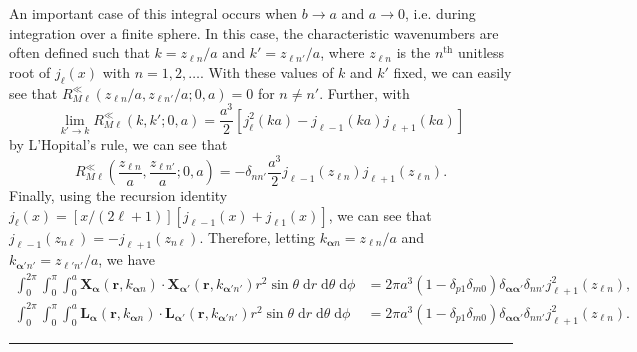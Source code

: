 An important case of this integral occurs when $b\to a$ and $a\to0$, i.e. during integration over a finite sphere. In this case, the characteristic wavenumbers are often defined such that $k = z_{\ell n}/a$ and $k' = z_{\ell n'}/a$, where $z_{\ell n}$ is the $n^\mathrm{th}$ unitless root of $j_\ell(x)$ with $n = 1,2,\ldots$. With these values of $k$ and $k'$ fixed, we can easily see that $R_{M\ell}^\ll(z_{\ell n}/a,z_{\ell n'}/a;0,a) = 0$ for $n\neq n'$. Further, with
\begin{equation}
\lim_{k'\to k}R_{M\ell}^\ll(k,k';0,a) = \frac{a^3}{2}\left[j_\ell^2(ka) - j_{\ell - 1}(ka)j_{\ell + 1}(ka)\right]
\end{equation}
by L'Hopital's rule, we can see that
\begin{equation}
R_{M\ell}^\ll\left(\frac{z_{\ell n}}{a},\frac{z_{\ell n'}}{a};0,a\right) = -\delta_{nn'}\frac{a^3}{2}j_{\ell - 1}(z_{\ell n})j_{\ell + 1}(z_{\ell n}).
\end{equation}
Finally, using the recursion identity $j_\ell(x) = [x/(2\ell + 1)][j_{\ell - 1}(x) + j_{\ell 1}(x)]$, we can see that $j_{\ell - 1}(z_{n\ell}) = -j_{\ell + 1}(z_{n\ell})$. Therefore, letting $k_{\bm{\alpha}n} = z_{\ell n}/a$ and $k_{\bm{\alpha}'n'} = z_{\ell'n'}/a$, we have
\begin{equation}
\begin{split}
\int_0^{2\pi}\int_0^\pi\int_0^a\mathbf{X}_{\bm{\alpha}}(\mathbf{r},k_{\bm{\alpha}n})\cdot\mathbf{X}_{\bm{\alpha}'}(\mathbf{r},k_{\bm{\alpha}'n'})r^2\sin\theta\;\mathrm{d}r\;\mathrm{d}\theta\;\mathrm{d}\phi &= 2\pi a^3(1 - \delta_{p1}\delta_{m0})\delta_{\bm{\alpha}\bm{\alpha}'}\delta_{nn'}j_{\ell + 1}^2(z_{\ell n}),\\
\int_0^{2\pi}\int_0^\pi\int_0^a\mathbf{L}_{\bm{\alpha}}(\mathbf{r},k_{\bm{\alpha}n})\cdot\mathbf{L}_{\bm{\alpha}'}(\mathbf{r},k_{\bm{\alpha}'n'})r^2\sin\theta\;\mathrm{d}r\;\mathrm{d}\theta\;\mathrm{d}\phi &= 2\pi a^3(1 - \delta_{p1}\delta_{m0})\delta_{\bm{\alpha}\bm{\alpha}'}\delta_{nn'}j_{\ell + 1}^2(z_{\ell n}).
\end{split}
\end{equation}

\noindent\rule{\textwidth}{0.5pt}\\

